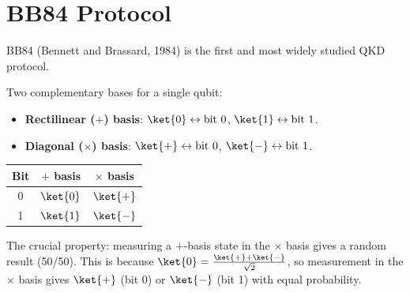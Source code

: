 \documentclass[oneside]{academica}
\begin{document}
\section{BB84 Protocol}

BB84 (Bennett and Brassard, 1984) is the first and most widely studied QKD protocol.

Two complementary bases for a single qubit:
\begin{itemize}
  \item \textbf{Rectilinear ($+$) basis}: $\ket{0}\leftrightarrow\text{bit }0$, $\ket{1}\leftrightarrow\text{bit }1$.
  \item \textbf{Diagonal ($\times$) basis}: $\ket{+}\leftrightarrow\text{bit }0$, $\ket{-}\leftrightarrow\text{bit }1$.
\end{itemize}

\begin{center}
  \renewcommand{\arraystretch}{1.3}
  \begin{tabular}{c|c|c}
    \textbf{Bit} & \textbf{$+$ basis} & \textbf{$\times$ basis} \\
    \hline
    0 & $\ket{0}$ & $\ket{+}$ \\
    1 & $\ket{1}$ & $\ket{-}$ \\
  \end{tabular}
\end{center}

The crucial property: measuring a $+$-basis state in the $\times$ basis gives a random result (50/50).
This is because $\ket{0}=\frac{\ket{+}+\ket{-}}{\sqrt{2}}$, so measurement in the $\times$ basis gives $\ket{+}$ (bit 0) or $\ket{-}$ (bit 1) with equal probability.
\end{document}
